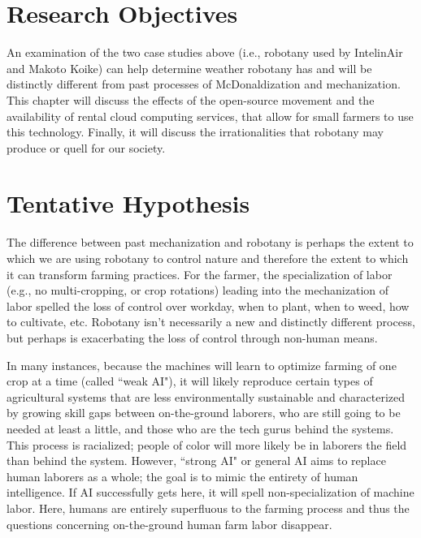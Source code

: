 \section{Research Objectives} 
An examination of the two case studies above (i.e., robotany used by IntelinAir and Makoto Koike) can help determine weather robotany has and will be distinctly different from past processes of McDonaldization and mechanization. This chapter will discuss the effects of the open-source movement and the availability of rental cloud computing services, that allow for small farmers to use this technology. Finally, it will discuss the irrationalities that robotany may produce or quell for our society.  
	
\section{Tentative Hypothesis} 
The difference between past mechanization and robotany is perhaps the extent to which we are using robotany to control nature and therefore the extent to which it can transform farming practices. For the farmer, the specialization of labor (e.g., no multi-cropping, or crop rotations) leading into the mechanization of labor spelled the loss of control over workday, when to plant, when to weed, how to cultivate, etc. Robotany isn't necessarily a new and distinctly different process, but perhaps is exacerbating the loss of control through non-human means.

In many instances, because the machines will learn to optimize farming of one crop at a time (called ``weak AI"), it will likely reproduce certain types of agricultural systems that are less environmentally sustainable and characterized by growing skill gaps between on-the-ground laborers, who are still going to be needed at least a little, and those who are the tech gurus behind the systems. This process is racialized; people of color will more likely be in laborers the field than behind the system. However, ``strong AI" or general AI aims to replace human laborers as a whole; the goal is to mimic the entirety of human intelligence. If AI successfully gets here, it will spell non-specialization of machine labor. Here, humans are entirely superfluous to the farming process and thus the questions concerning on-the-ground human farm labor disappear. 

